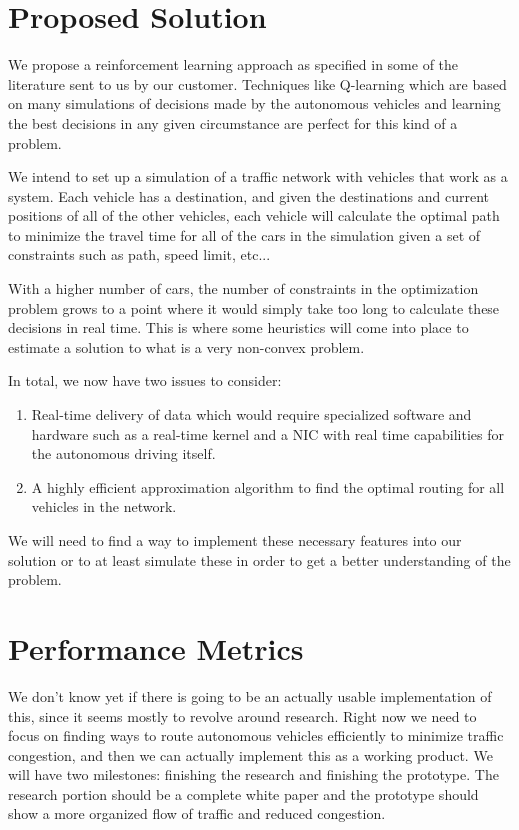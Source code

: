\documentclass[letterpaper, 10 pt, conference, draftclsnofoot, onecolumn]{ieeeconf}
\begin{document}
\maketitle
\section{Proposed Solution}
    We propose a reinforcement learning approach as specified in some of the literature sent to us by our customer. Techniques like Q-learning which are based on many simulations of decisions made by the autonomous vehicles and learning the best decisions in any given circumstance are perfect for this kind of a problem. 
    
    We intend to set up a simulation of a traffic network with vehicles that work as a system. Each vehicle has a destination, and given the destinations and current positions of all of the other vehicles, each vehicle will calculate the optimal path to minimize the travel time for all of the cars in the simulation given a set of constraints such as path, speed limit, etc...
    
    With a higher number of cars, the number of constraints in the optimization problem grows to a point where it would simply take too long to calculate these decisions in real time. This is where some heuristics will come into place to estimate a solution to what is a very non-convex problem.
    
    In total, we now have two issues to consider: 
    \begin{enumerate}
        \item Real-time delivery of data which would require specialized software and hardware such as a real-time kernel and a NIC with real time capabilities for the autonomous driving itself.
        \item A highly efficient approximation algorithm to find the optimal routing for all vehicles in the network.
    \end{enumerate}
    We will need to find a way to implement these necessary features into our solution or to at least simulate these in order to get a better understanding of the problem.
    
\maketitle
\section{Performance Metrics}
    We don't know yet if there is going to be an actually usable implementation of this, since it seems mostly to revolve around research. Right now we need to focus on finding ways to route autonomous vehicles efficiently to minimize traffic congestion, and then we can actually implement this as a working product. We will have two milestones: finishing the research and finishing the prototype. The research portion should be a complete white paper and the prototype should show a more organized flow of traffic and reduced congestion.
    
\end{document}
